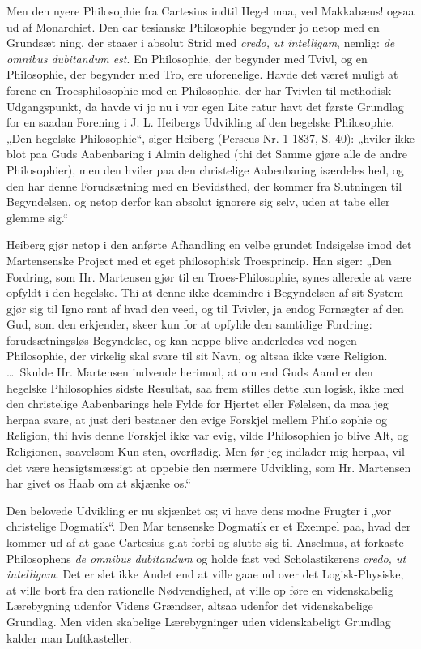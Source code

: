 \documentclass[12pt]{book}
\newcommand{\opage}[1]{\marginnote{\footnotesize\textit{[#1]}}}
\begin{document}
Men den nyere Philosophie fra Cartesius indtil Hegel
maa, ved Makkabæus! ogsaa ud af Monarchiet. Den car\-%
tesianske Philosophie begynder jo netop med en Grundsæt\-%
ning, der staaer i absolut Strid med \textit{credo, ut intelligam},
nemlig: \textit{de omnibus dubitandum est}. En Philosophie, der
begynder med Tvivl, og en Philosophie, der begynder med
Tro, ere uforenelige. Havde det været muligt at forene en
Troesphilosophie med en Philosophie, der har Tvivlen til
methodisk Udgangspunkt, da havde vi jo nu i vor egen Lite\-%
ratur havt det første Grundlag for en saadan Forening i
J. L. Heibergs Udvikling af den hegelske Philosophie. „Den
hegelske Philosophie“, siger Heiberg (Perseus Nr. 1 1837,
\opage{106}\setcounter{footnote}{0}%
S. 40): „hviler ikke blot paa Guds Aabenbaring i Almin\-%
delighed (thi det Samme gjøre alle de andre Philosophier),
men den hviler paa den christelige Aabenbaring isærdeles\-%
hed, og den har denne Forudsætning med en Bevidsthed, der
kommer fra Slutningen til Begyndelsen, og netop derfor kan
absolut ignorere sig selv, uden at tabe eller glemme sig.“

Heiberg gjør netop i den anførte Afhandling en velbe\-%
grundet Indsigelse imod det Martensenske Project med et
eget philosophisk Troesprincip. Han siger: „Den Fordring, %
som Hr. Martensen gjør til en Troes-Philosophie, synes
allerede at være opfyldt i den hegelske. Thi at denne ikke
desmindre i Begyndelsen af sit System gjør sig til Igno\-%
rant af hvad den veed, og til Tvivler, ja endog Fornægter
af den Gud, som den erkjender, skeer kun for at opfylde den
samtidige Fordring: forudsætningsløs Begyndelse, og kan
neppe blive anderledes ved nogen Philosophie, der virkelig
skal svare til sit Navn, og altsaa ikke være Religion. \dots\
Skulde Hr. Martensen indvende herimod, at om end Guds
Aand er den hegelske Philosophies sidste Resultat, saa frem\-%
stilles dette kun logisk, ikke med den christelige Aabenbarings
hele Fylde for Hjertet eller Følelsen, da maa jeg herpaa
svare, at just deri bestaaer den evige Forskjel mellem Philo\-%
sophie og Religion, thi hvis denne Forskjel ikke var evig,
vilde Philosophien jo blive Alt, og Religionen, saavelsom Kun\-%
sten, overflødig. Men før jeg indlader mig herpaa, vil det
være hensigtsmæssigt at oppebie den nærmere Udvikling, som
Hr. Martensen har givet os Haab om at skjænke os.“

Den belovede Udvikling er nu skjænket os; vi have dens
modne Frugter i „vor christelige Dogmatik“. Den Mar\-%
tensenske Dogmatik er et Exempel paa, hvad der kommer ud
af at gaae Cartesius glat forbi og slutte sig til Anselmus, at
forkaste Philosophens \textit{de omnibus dubitandum} og holde
fast ved Scholastikerens \textit{credo, ut intelligam}. Det er
slet ikke Andet end at ville gaae ud over det Logisk-Physiske,
\opage{107}\setcounter{footnote}{0}%
at ville bort fra den rationelle Nødvendighed, at ville op\-%
føre en videnskabelig Lærebygning udenfor Videns Grændser,
altsaa udenfor det videnskabelige Grundlag. Men viden\-%
skabelige Lærebygninger uden videnskabeligt Grundlag kalder
man Luftkasteller.
\end{document}
